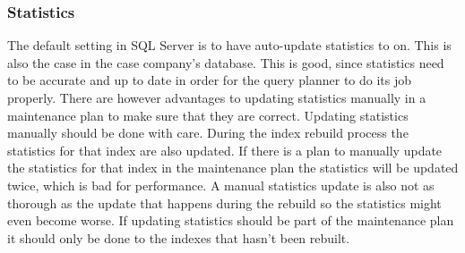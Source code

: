 \documentclass{cslthse-msc}
\begin{document}
\subsubsection{Statistics}
The default setting in SQL Server is to have auto-update statistics to on. This is also the case in the case company's database. This is good, since statistics need to be accurate and up to date in order for the query planner to do its job properly. There are however advantages to updating statistics manually in a maintenance plan to make sure that they are correct. Updating statistics manually should be done with care. During the index rebuild process the statistics for that index are also updated. If there is a plan to manually update the statistics for that index in the maintenance plan the statistics will be updated twice, which is bad for performance. A manual statistics update is also not as thorough as the update that happens during the rebuild so the statistics might even become worse. If updating statistics should be part of the maintenance plan it should only be done to the indexes that hasn't been rebuilt.
\end{document}
